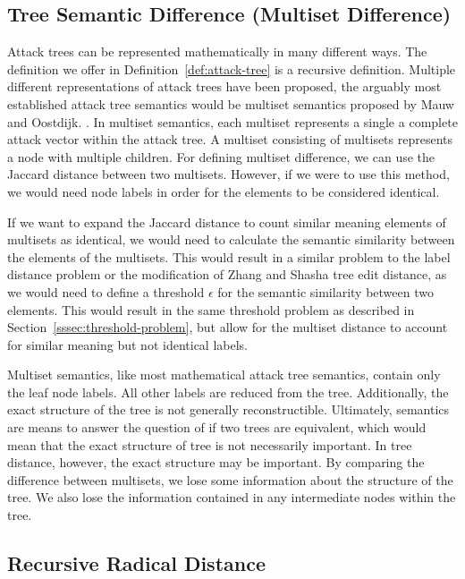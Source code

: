 \subsection{Tree Semantic Difference (Multiset Difference)}

Attack trees can be represented mathematically in many different ways. The definition we offer in Definition~\ref{def:attack-tree} is a recursive definition. Multiple different representations of attack trees have been proposed, the arguably most established attack tree semantics would be multiset semantics proposed by Mauw and Oostdijk. . In multiset semantics, each multiset represents a single a complete attack vector within the attack tree. A multiset consisting of multisets represents a node with multiple children. For defining multiset difference, we can use the Jaccard distance between two multisets. However, if we were to use this method, we would need node labels in order for the elements to be considered identical.

If we want to expand the Jaccard distance to count similar meaning elements of multisets as identical, we would need to calculate the semantic similarity between the elements of the multisets. This would result in a similar problem to the label distance problem or the modification of Zhang and Shasha tree edit distance, as we would need to define a threshold $\epsilon$ for the semantic similarity between two elements. This would result in the same threshold problem as described in Section~\ref{sssec:threshold-problem}, but allow for the multiset distance to account for similar meaning but not identical labels.

Multiset semantics, like most mathematical attack tree semantics, contain only the leaf node labels. All other labels are reduced from the tree. Additionally, the exact structure of the tree is not generally reconstructible. Ultimately, semantics are means to answer the question of if two trees are equivalent, which would mean that the exact structure of tree is not necessarily important. In tree distance, however, the exact structure may be important. By comparing the difference between multisets, we lose some information about the structure of the tree. We also lose the information contained in any intermediate nodes within the tree.



\subsection{Recursive Radical Distance}

